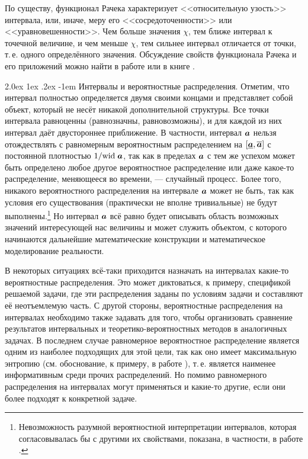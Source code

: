 \documentclass[a5paper,openany]{book}
\makeatletter
\newcommand{\mbf}[1]{\protect\text{\boldmath$#1$}}
\newcommand{\ov}{\overline}
\newcommand{\un}{\underline}
\newcommand{\w}{\mathrm{wid}\;}
\renewcommand\paragraph{\@startsection{paragraph}{4}{\z@}%
                         {2.0ex \@plus1ex \@minus.2ex}%
                         {-1em}%
                         {\normalfont\normalsize\bfseries}}
\makeatother
\begin{document}
По существу,  функционал Рачека характеризует <<относительную узость>> интервала, 
или, иначе, меру его <<сосредоточенности>> или <<уравновешенности>>. Чем больше 
значения $\chi$, тем ближе интервал к точечной величине, и чем меньше $\chi$, 
тем сильнее интервал отличается от точки, т.\,е. одного определённого значения. 
Обсуждение свойств функционала Рачека и его приложений можно найти в работе 
\cite{IreneJCT1997} или в книге \cite{SSharyBook}. 
  
  
\paragraph{Интервалы и вероятностные распределения.}  
Отметим, что интервал полностью определяется двумя своими концами и представляет 
собой объект, который не несёт никакой дополнительной структуры. Все точки интервала 
равноценны (равнозначны, равновозможны), и для каждой из них интервал даёт двустороннее 
приближение. В частности, интервал $\mbf{a}$ нельзя отождествлять с равномерным 
вероятностным распределением на $[\un{\mbf{a}}, \ov{\mbf{a}}]$ с постоянной плотностью 
$1/\w\mbf{a}$, так как в пределах $\mbf{a}$ с тем же успехом может быть определено 
любое другое вероятностное распределение или даже какое-то распределение, меняющееся 
во времени, --- случайный процесс. Более того, никакого вероятностного распределения 
на интервале $\mbf{a}$ может не быть, так как условия его существования (практически 
не вполне тривиальные) не будут выполнены.\footnote{Невозможность разумной вероятностной 
интерпретации интервалов, которая согласовывалась бы с другими их свойствами, показана, 
в частности, в работе \cite{Bronstejn}.} Но интервал $\mbf{a}$ всё равно будет описывать 
область возможных значений интересующей нас величины и может служить объектом, с которого 
начинаются дальнейшие математические конструкции и математическое моделирование реальности. 
  
В некоторых ситуациях всё-таки приходится назначать на интервалах какие-то 
вероятностные распределения. Это может диктоваться, к примеру, спецификой решаемой 
задачи, где эти распределения заданы по условиям задачи и составляют её неотъемлемую 
часть. С другой стороны, вероятностные распределения на интервалах необходимо также 
задавать для того, чтобы организовать сравнение результатов интервальных и 
теоретико-вероятностных методов в аналогичных задачах. В последнем случае равномерное
вероятностное распределение является одним из наиболее подходящих для этой цели, 
так как оно имеет максимальную энтропию (см. обоснование, к примеру, в работе 
\cite{KreinovichShary}), т.\,е. является наименее информативным среди прочих 
распределений. Но помимо равномерного распределения на интервалах могут применяться 
и какие-то другие, если они более подходят к конкретной задаче.  
  
\end{document}
